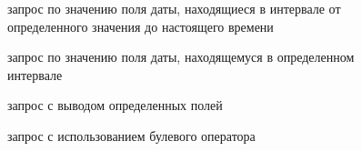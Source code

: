 \begin{figure}[h!]
\caption{запрос по значению поля даты, находящиеся в интервале от определенного значения до настоящего времени}
\label{ship_21:ship_21}
\end{figure}

\begin{figure}[h!]
\caption{запрос по значению поля даты, находящемуся в определенном интервале}
\label{ship_22:ship_22}
\end{figure}


\begin{figure}[h!]
\caption{запрос с выводом определенных полей}
\label{ship_23:ship_23}
\end{figure}

\begin{figure}[h!]
\caption{запрос с использованием булевого оператора}
\label{ship_24:ship_24}
\end{figure}

\clearpage

